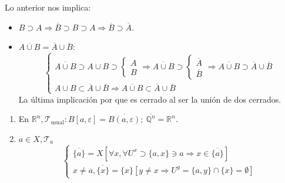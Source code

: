 \begin{obs}
Lo anterior nos implica:
\begin{itemize}
    \item $B \supset A \Rightarrow \overline{B} \supset B \supset A \Rightarrow \overline{B} \supset \overline{A}$.
    \item $\overline{A \cup B} = \overline{A} \cup \overline{B}$:
    \[
    \begin{cases}
        \overline{A\cup B} \supset A \cup B \supset \begin{cases}
            A\\B
        \end{cases} \Rightarrow \overline{A\cup B} \supset \begin{cases}
            \overline{A} \\ \overline{B} 
        \end{cases} \Rightarrow \overline{A\cup B} \supset \overline{A} \cup \overline{B}\\

        A \cup B \subset \overline{A} \cup \overline{B} \Rightarrow \overline{A\cup B} \subset \overline{A} \cup \overline{B} 
    \end{cases} 
    \]
    La última implicación por que es cerrado al ser la unión de dos cerrados.
\end{itemize}
\end{obs}

\begin{ej}
\begin{enumerate}
    \item En $\mathbb{R}^n, \mathcal{T}_{\text{usual}}: B\left[ a, \varepsilon \right] = \overline{B \left( a, \varepsilon \right)};\ \overline{\mathbb{Q}^n} = \mathbb{R}^n$.
    \item $a \in X, \mathcal{T}_a$
    \[
        \begin{cases}
        \overline{\{a\}} = X \left[ \forall x, \forall U^x \supset \{a, x\} \ni a \Rightarrow x \in \overline{\{a\}} \right]\\
        x \neq a, \overline{\{x\}} = \{x\} \left[ y\neq x \Rightarrow U^y = \{a, y\} \cap \{x\} = \emptyset \right] 
        \end{cases} 
    \]
\end{enumerate}
\end{ej}

